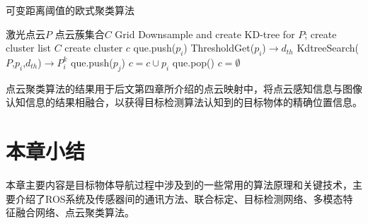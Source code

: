 \begin{algorithm}[!h]
    \caption{可变距离阈值的欧式聚类算法}
    \label{algorithm1}
    \renewcommand{\algorithmicrequire}{\textbf{Input:}}
    \renewcommand{\algorithmicensure}{\textbf{Output:}}
    \renewcommand{\algorithmiccomment}[1]{\hfill $\triangleright$ #1}
    \begin{algorithmic}[1]
        \REQUIRE 激光点云$P$  %
        \ENSURE 点云蔟集合$C$    %
        \STATE  Grid Downsample and create KD-tree for $P$;
        \STATE  create cluster list $C$
        \STATE  create cluster $c$
            \STATE  que.push(${p_i}$)
                \STATE  ThresholdGet(${p_i}$)$ \to {d_{th}}$
                \STATE  KdtreeSearch($P$,${p_i}$,${d_{th}}$)$ \to P_i^k$
                    \STATE  que.push(${p_j}$)
                \ENDFOR
                \STATE  $c = c \cup {p_i}$
                \STATE  que.pop()
            \ENDWHILE
            $c = \emptyset $
        \ENDFOR
    \end{algorithmic}
\end{algorithm}

点云聚类算法的结果用于后文第四章所介绍的点云映射中，将点云感知信息与图像认知信息的结果相融合，以获得目标检测算法认知到的目标物体的精确位置信息。


\section{本章小结}
本章主要内容是目标物体导航过程中涉及到的一些常用的算法原理和关键技术，主要介绍了ROS系统及传感器间的通讯方法、联合标定、目标检测网络、多模态特征融合网络、点云聚类算法。

